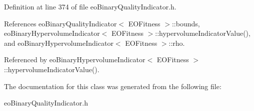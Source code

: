 Definition at line 374 of file eo\-Binary\-Quality\-Indicator.h.

References eo\-Binary\-Quality\-Indicator$<$ EOFitness $>$::bounds, eo\-Binary\-Hypervolume\-Indicator$<$ EOFitness $>$::hypervolume\-Indicator\-Value(), and eo\-Binary\-Hypervolume\-Indicator$<$ EOFitness $>$::rho.

Referenced by eo\-Binary\-Hypervolume\-Indicator$<$ EOFitness $>$::hypervolume\-Indicator\-Value().

The documentation for this class was generated from the following file:\begin{CompactItemize}
\item 
eo\-Binary\-Quality\-Indicator.h\end{CompactItemize}
